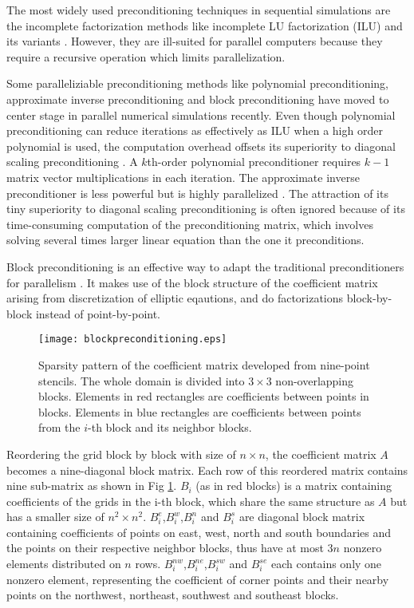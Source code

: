 The most widely used preconditioning techniques in sequential simulations are the incomplete factorization methods like incomplete LU factorization (ILU) and its variants \cite{benzi2002preconditioning}.
However, they are ill-suited for parallel computers because they require a recursive operation which limits parallelization. 

Some paralleliziable preconditioning methods like polynomial preconditioning, approximate inverse preconditioning and block preconditioning have moved to center stage in parallel numerical simulations recently.
Even though polynomial preconditioning can reduce iterations as effectively as ILU when a high order polynomial is used, the computation overhead offsets its superiority to diagonal scaling preconditioning \cite{meyer1989numerical,smith1992parallel}. 
A $k$th-order polynomial preconditioner requires $k-1$ matrix vector multiplications in each iteration. 
The approximate inverse preconditioner is less powerful but is highly parallelized \cite{smith1992parallel,bergamaschi2007numerical}.
The attraction of its tiny superiority to diagonal scaling preconditioning is often ignored because of its time-consuming computation of the preconditioning matrix,
which involves solving several times larger linear equation than the one it preconditions. 

Block preconditioning is an effective way to adapt the traditional preconditioners for parallelism \cite{concus1985block, white2011block}. 
It makes use of the block structure of the coefficient matrix arising from discretization of elliptic eqautions, and do factorizations block-by-block instead of point-by-point. 


\begin {figure}
\centering
\texttt{[image: blockpreconditioning.eps]}
\caption[] {Sparsity pattern of the coefficient matrix developed from nine-point stencils. 
The whole domain is divided into $3\times3$ non-overlapping blocks.
Elements in red rectangles are coefficients between points in blocks. 
Elements in blue rectangles are coefficients between points from the $i$-th block and its neighbor blocks. \label{fig:blockprecond}}
\end{figure}

Reordering the grid block by block with size of $n\times n$, the coefficient matrix $A$ becomes a nine-diagonal block matrix. 
Each row of this reordered matrix contains nine sub-matrix as shown in Fig \ref{fig:blockprecond}. %
$B_i$ (as in red blocks) is a matrix containing coefficients of the grids in the i-th block, which share the same structure as $A$ but has a smaller size of $n^2\times n^2$. 
$B_i^e$,$B_i^w$,$B_i^n$ and $B_i^s$ are diagonal block matrix containing coefficients of points on east, west, north and south boundaries and the points on their respective neighbor blocks, thus have at most $3n$ nonzero elements distributed on $n$ rows. 
$B_i^{nw}$,$B_i^{ne}$,$B_i^{sw}$ and $B_i^{se}$ each contains only one nonzero element, representing the coefficient of corner points and their nearby points on the northwest, northeast, southwest and southeast blocks. 

